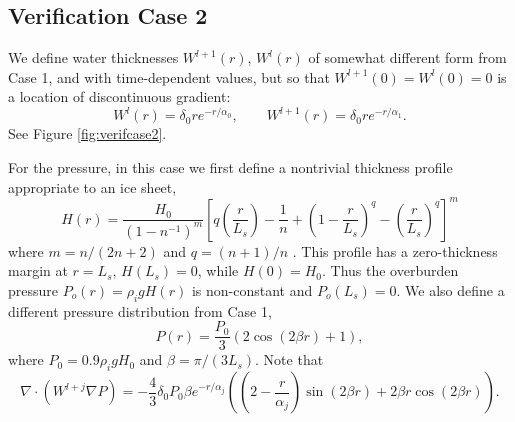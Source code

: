 \documentclass[11pt]{amsart}
\begin{document}
\subsection*{Verification Case 2}  We define water thicknesses $W^{l+1}(r)$, $W^{l}(r)$ of somewhat different form from Case 1, and with time-dependent values, but so that $W^{l+1}(0) = W^{l}(0) = 0$ is a location of discontinuous gradient:
\begin{equation} \label{eq:manuWWtwo}
W^l(r) = \delta_0 r e^{-r/\alpha_0}, \qquad W^{l+1}(r) = \delta_0 r e^{-r/\alpha_1}.\end{equation}
See Figure \ref{fig:verifcase2}.

For the pressure, in this case we first define a nontrivial thickness profile appropriate to an ice sheet,
\begin{equation} \label{eq:profiletwo}
H(r) = \frac{H_0}{(1-n^{-1})^m} \left[q\left(\frac{r}{L_s}\right) - \frac{1}{n} + \left(1 - \frac{r}{L_s}\right)^q - \left(\frac{r}{L_s}\right)^q \right]^m
\end{equation}
where $m=n/(2n+2)$ and $q = (n+1)/n$ \citep[][subsection FIXME]{GreveBlatter2009}.  This profile has a zero-thickness margin at $r=L_s$, $H(L_s)=0$, while $H(0)=H_0$.  Thus the overburden pressure $P_o(r) = \rho_i g H(r)$ is non-constant and $P_o(L_s)=0$.  We also define a different pressure distribution from Case 1,
\begin{equation} \label{eq:manuPtwo}
P(r) = \frac{P_0}{3} \left(2\cos\left(2 \beta r\right) + 1\right),
\end{equation}
where $P_0 = 0.9 \rho_i g H_0$ and $\beta = \pi / (3 L_s)$.  Note that
\begin{equation*}
\nabla \cdot \left(W^{l+j} \nabla P\right) = - \frac{4}{3} \delta_0 P_0 \beta e^{-r/\alpha_j} \left(\left(2-\frac{r}{\alpha_j}\right)\sin(2\beta r) + 2 \beta r \cos(2 \beta r)\right).
\end{equation*}
\end{document}
